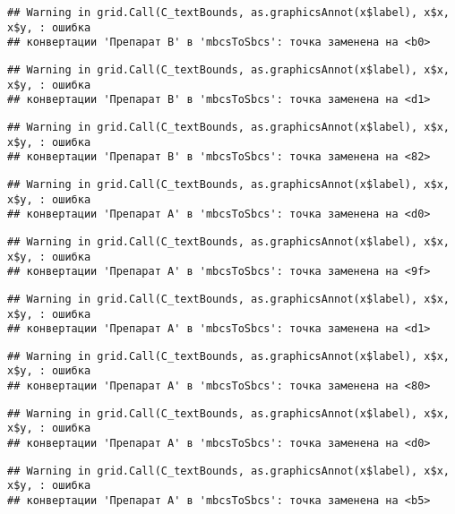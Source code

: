 \documentclass[
]{article}
\begin{document}
\begin{verbatim}
## Warning in grid.Call(C_textBounds, as.graphicsAnnot(x$label), x$x, x$y, : ошибка
## конвертации 'Препарат B' в 'mbcsToSbcs': точка заменена на <b0>
\end{verbatim}

\begin{verbatim}
## Warning in grid.Call(C_textBounds, as.graphicsAnnot(x$label), x$x, x$y, : ошибка
## конвертации 'Препарат B' в 'mbcsToSbcs': точка заменена на <d1>
\end{verbatim}

\begin{verbatim}
## Warning in grid.Call(C_textBounds, as.graphicsAnnot(x$label), x$x, x$y, : ошибка
## конвертации 'Препарат B' в 'mbcsToSbcs': точка заменена на <82>
\end{verbatim}

\begin{verbatim}
## Warning in grid.Call(C_textBounds, as.graphicsAnnot(x$label), x$x, x$y, : ошибка
## конвертации 'Препарат A' в 'mbcsToSbcs': точка заменена на <d0>
\end{verbatim}

\begin{verbatim}
## Warning in grid.Call(C_textBounds, as.graphicsAnnot(x$label), x$x, x$y, : ошибка
## конвертации 'Препарат A' в 'mbcsToSbcs': точка заменена на <9f>
\end{verbatim}

\begin{verbatim}
## Warning in grid.Call(C_textBounds, as.graphicsAnnot(x$label), x$x, x$y, : ошибка
## конвертации 'Препарат A' в 'mbcsToSbcs': точка заменена на <d1>
\end{verbatim}

\begin{verbatim}
## Warning in grid.Call(C_textBounds, as.graphicsAnnot(x$label), x$x, x$y, : ошибка
## конвертации 'Препарат A' в 'mbcsToSbcs': точка заменена на <80>
\end{verbatim}

\begin{verbatim}
## Warning in grid.Call(C_textBounds, as.graphicsAnnot(x$label), x$x, x$y, : ошибка
## конвертации 'Препарат A' в 'mbcsToSbcs': точка заменена на <d0>
\end{verbatim}

\begin{verbatim}
## Warning in grid.Call(C_textBounds, as.graphicsAnnot(x$label), x$x, x$y, : ошибка
## конвертации 'Препарат A' в 'mbcsToSbcs': точка заменена на <b5>
\end{verbatim}
\end{document}
